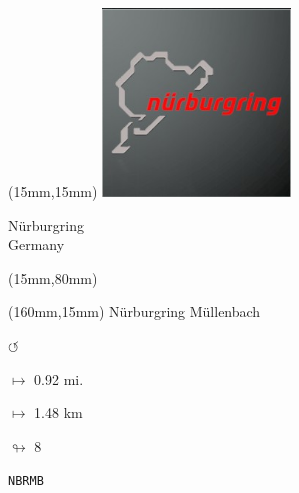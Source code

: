 \begin{textblock*}{50mm}(15mm,15mm)%
\includegraphics[width=50mm]{LG/2015-05-20_00089.png}
\par Nürburgring\\ Germany
\end{textblock*}
\begin{textblock*}{185mm}(15mm,80mm)%
\end{textblock*}
\begin{textblock*}{40mm}(160mm,15mm)%
Nürburgring Müllenbach
\par \Huge$\circlearrowleft$
\Large
\par$\mapsto$ 0.92 mi.
\par$\mapsto$ 1.48 km
\par$\looparrowright$ 8
\par\hfill\tiny\tt NBRMB\\
\end{textblock*}
\null\newpage

